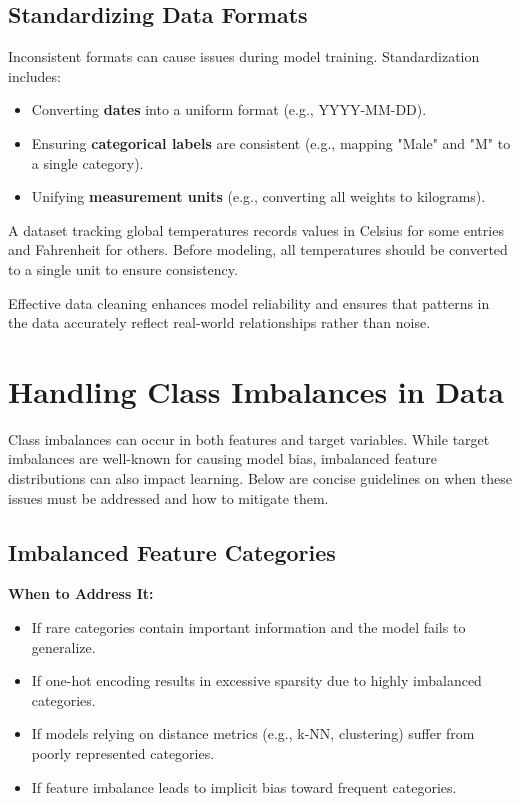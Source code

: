 \documentclass[12pt,openany]{book}
\begin{document}
\subsection{Standardizing Data Formats}
Inconsistent formats can cause issues during model training. Standardization includes:

\begin{itemize}
    \item Converting \textbf{dates} into a uniform format (e.g., YYYY-MM-DD).
    \item Ensuring \textbf{categorical labels} are consistent (e.g., mapping "Male" and "M" to a single category).
    \item Unifying \textbf{measurement units} (e.g., converting all weights to kilograms).
\end{itemize}

\begin{examplebox}
A dataset tracking global temperatures records values in Celsius for some entries and Fahrenheit for others. Before modeling, all temperatures should be converted to a single unit to ensure consistency.
\end{examplebox}

Effective data cleaning enhances model reliability and ensures that patterns in the data accurately reflect real-world relationships rather than noise. \newline



\section{Handling Class Imbalances in Data}

Class imbalances can occur in both features and target variables. While target imbalances are well-known for causing model bias, imbalanced feature distributions can also impact learning. Below are concise guidelines on when these issues must be addressed and how to mitigate them.

\subsection{Imbalanced Feature Categories}

\textbf{When to Address It:}
\begin{itemize}
    \item If rare categories contain important information and the model fails to generalize.
    \item If one-hot encoding results in excessive sparsity due to highly imbalanced categories.
    \item If models relying on distance metrics (e.g., k-NN, clustering) suffer from poorly represented categories.
    \item If feature imbalance leads to implicit bias toward frequent categories.
\end{itemize}
\end{document}
